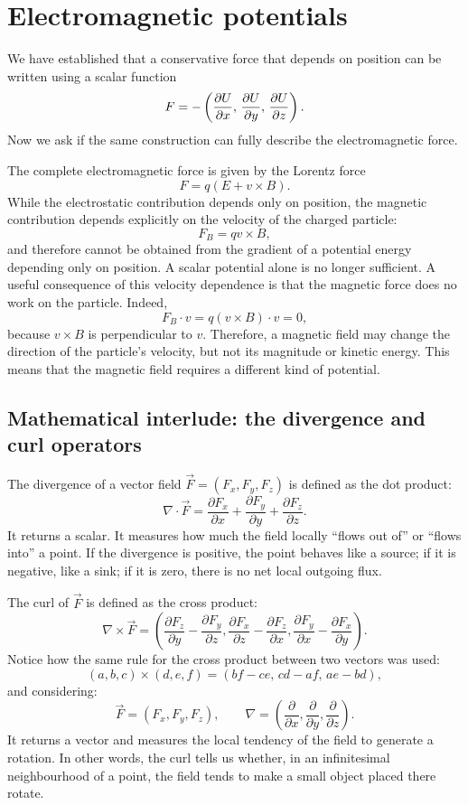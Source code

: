 \section{Electromagnetic potentials}

We have established that a conservative force that depends on position can be
written using a scalar function
\[
	F = - \left( \frac{\partial U}{\partial x},\, \frac{\partial U}{\partial y},\, \frac{\partial U}{\partial z} \right).
\]
Now we ask if the same construction can fully describe the electromagnetic force.

The complete electromagnetic force is given by the Lorentz force
\[
	F = q (E + v \times B).
\]
While the electrostatic contribution depends only on position, the magnetic
contribution depends explicitly on the velocity of the charged particle:
\[
	F_B = q v \times B,
\]
and therefore cannot be obtained from the gradient of a potential energy depending
only on position. A scalar potential alone is no longer sufficient.
A useful consequence of this velocity dependence is that the magnetic force
does no work on the particle. Indeed,
\[
	F_B \cdot v
	=
	q(v \times B)\cdot v
	=
	0,
\]
because \(v \times B\) is perpendicular to \(v\).
Therefore, a magnetic field may change the direction of the particle's
velocity, but not its magnitude or kinetic energy. This means that the magnetic
field requires a different kind of potential.
\subsection{Mathematical interlude: the divergence and curl operators}

The divergence of a vector field $\vec{F}=(F_x,F_y,F_z)$ is defined as the dot product:
\[
	\nabla \cdot \vec{F}
	=
	\frac{\partial F_x}{\partial x}
	+
	\frac{\partial F_y}{\partial y}
	+
	\frac{\partial F_z}{\partial z}.
\]
It returns a scalar. It measures how much the field locally ``flows out of'' or ``flows into'' a point. If the divergence is positive, the point behaves like a source; if it is negative, like a sink; if it is zero, there is no net local outgoing flux.


The curl of $\vec{F}$ is defined as the cross product:
\[
	\nabla \times \vec{F}
	=
	\left(
	\frac{\partial F_z}{\partial y}
	-
	\frac{\partial F_y}{\partial z},
	\frac{\partial F_x}{\partial z}
	-
	\frac{\partial F_z}{\partial x},
	\frac{\partial F_y}{\partial x}
	-
	\frac{\partial F_x}{\partial y}
	\right).
\]
Notice how the same rule for the cross product between two vectors was used:
\[
	(a,b,c)\times(d,e,f)
	=
	(bf-ce,\,cd-af,\,ae-bd),
\]
and considering:
\[
	\vec{F}=(F_x,F_y,F_z),
	\qquad
	\nabla
	=
	\left(
	\frac{\partial}{\partial x},
	\frac{\partial}{\partial y},
	\frac{\partial}{\partial z}
	\right).
\]
It returns a vector and measures the local tendency of the field to generate a rotation. In other words, the curl tells us whether, in an infinitesimal neighbourhood of a point, the field tends to make a small object placed there rotate.


